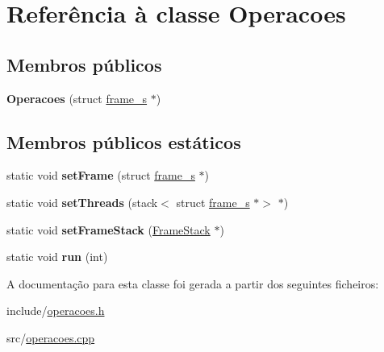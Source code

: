 \hypertarget{classOperacoes}{}\section{Referência à classe Operacoes}
\label{classOperacoes}
\subsection*{Membros públicos}
\begin{DoxyCompactItemize}
\item 
\mbox{\label{classOperacoes_a2122b7e6890e56a386118b62b32a7523}} 
{\bfseries Operacoes} (struct \hyperlink{structframe__s}{frame\+\_\+s} $\ast$)
\end{DoxyCompactItemize}
\subsection*{Membros públicos estáticos}
\begin{DoxyCompactItemize}
\item 
\mbox{\label{classOperacoes_a787f291554d319e73daa2e91d77823bd}} 
static void {\bfseries set\+Frame} (struct \hyperlink{structframe__s}{frame\+\_\+s} $\ast$)
\item 
\mbox{\label{classOperacoes_ac50ddb76ffb9bcd17ac19e449ac52e39}} 
static void {\bfseries set\+Threads} (stack$<$ struct \hyperlink{structframe__s}{frame\+\_\+s} $\ast$$>$ $\ast$)
\item 
\mbox{\label{classOperacoes_a458ce9c1aec4fd809eecee9b005fcbf5}} 
static void {\bfseries set\+Frame\+Stack} (\hyperlink{classFrameStack}{Frame\+Stack} $\ast$)
\item 
\mbox{\label{classOperacoes_ac25eec2246429c071161b918ec447b18}} 
static void {\bfseries run} (int)
\end{DoxyCompactItemize}


A documentação para esta classe foi gerada a partir dos seguintes ficheiros\+:\begin{DoxyCompactItemize}
\item 
include/\hyperlink{operacoes_8h}{operacoes.\+h}\item 
src/\hyperlink{operacoes_8cpp}{operacoes.\+cpp}\end{DoxyCompactItemize}
